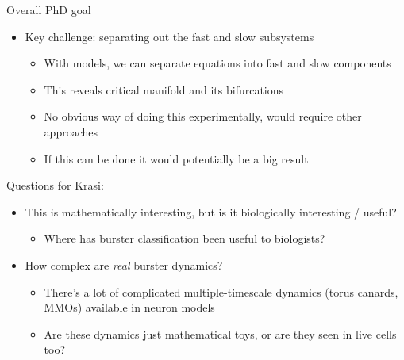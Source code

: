 \documentclass[presentation]{beamer}
\begin{document}
\begin{frame}[label={sec:org3dad4d5}]{Overall PhD goal}
\begin{itemize}
\item Key challenge: separating out the fast and slow subsystems
\begin{itemize}
\item With models, we can separate equations into fast and slow components
\item This reveals critical manifold and its bifurcations
\item No obvious way of doing this experimentally, would require other approaches
\item If this can be done it would potentially be a big result
\end{itemize}
\end{itemize}
\vfill
Questions for Krasi:
\begin{itemize}
\item This is mathematically interesting, but is it biologically interesting / useful?
\begin{itemize}
\item Where has burster classification been useful to biologists?
\end{itemize}
\item How complex are \emph{real} burster dynamics?
\begin{itemize}
\item There's a lot of complicated multiple-timescale dynamics (torus canards, MMOs) available in neuron models
\item Are these dynamics just mathematical toys, or are they seen in live cells too?
\end{itemize}
\end{itemize}
\end{frame}
\end{document}
